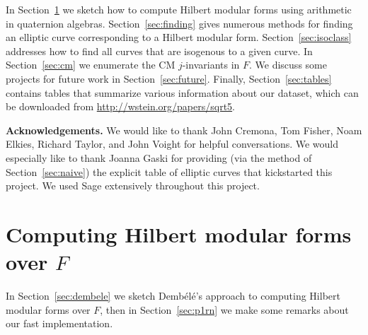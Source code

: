 \documentclass{amsart}
\newcommand{\dembele}{Demb\'el{\'e}\xspace}
\begin{document}
In Section~\ref{sec:hmf} we sketch how to compute Hilbert modular
forms using arithmetic in quaternion
algebras. Section~\ref{sec:finding} gives numerous methods for finding
an elliptic curve corresponding to a Hilbert modular form.
Section~\ref{sec:isoclass} addresses how to find all curves that are
isogenous to a given curve.  
In Section~\ref{sec:cm} we enumerate the CM $j$-invariants in $F$.
We discuss some projects for future work in
Section~\ref{sec:future}.  Finally, Section~\ref{sec:tables} contains
tables that summarize various information about our
dataset, which can be downloaded from
\url{http://wstein.org/papers/sqrt5}.

{\bf Acknowledgements.} We would like to thank John Cremona, Tom
Fisher, Noam Elkies, Richard Taylor, and John Voight for helpful
conversations.  We would especially like to thank Joanna Gaski for
providing (via the method of Section~\ref{sec:naive}) the explicit
table of elliptic curves that kickstarted this project.
We used Sage \cite{sage} extensively throughout this project.

\section{Computing Hilbert modular forms over $F$}\label{sec:hmf}

In Section~\ref{sec:dembele} we sketch \dembele's approach to computing Hilbert
modular forms over $F$, then in Section~\ref{sec:p1rn} we make
some remarks about our fast implementation. 
\end{document}
